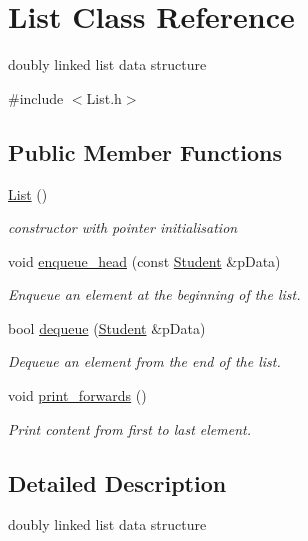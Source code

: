 \hypertarget{class_list}{}\section{List Class Reference}
\label{class_list}


doubly linked list data structure  




{\ttfamily \#include $<$List.\+h$>$}

\subsection*{Public Member Functions}
\begin{DoxyCompactItemize}
\item 
\mbox{\label{class_list_a64d878a92d11f7c63c70cbe4e7dd4176}} 
\hyperlink{class_list_a64d878a92d11f7c63c70cbe4e7dd4176}{List} ()
\begin{DoxyCompactList}\small\item\em constructor with pointer initialisation \end{DoxyCompactList}\item 
void \hyperlink{class_list_abe1c128f9a438009a7ebe1ff946963cf}{enqueue\+\_\+head} (const \hyperlink{class_student}{Student} \&p\+Data)
\begin{DoxyCompactList}\small\item\em Enqueue an element at the beginning of the list. \end{DoxyCompactList}\item 
bool \hyperlink{class_list_addc22172363ef656a20069489a1d003f}{dequeue} (\hyperlink{class_student}{Student} \&p\+Data)
\begin{DoxyCompactList}\small\item\em Dequeue an element from the end of the list. \end{DoxyCompactList}\item 
void \hyperlink{class_list_a9cd9aa3b710f2c17acbc41a9c376f337}{print\+\_\+forwards} ()
\begin{DoxyCompactList}\small\item\em Print content from first to last element. \end{DoxyCompactList}\end{DoxyCompactItemize}


\subsection{Detailed Description}
doubly linked list data structure 


